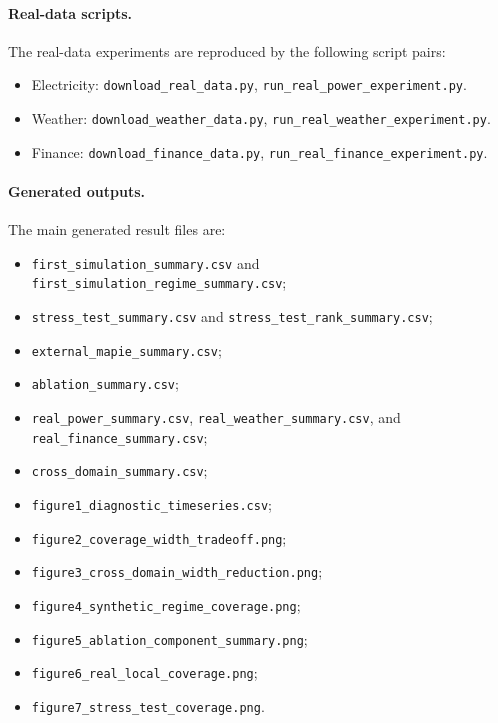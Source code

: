 \documentclass[11pt]{article}
\begin{document}
\paragraph{Real-data scripts.}
The real-data experiments are reproduced by the following script pairs:
\begin{itemize}
    \item Electricity: \texttt{download\_real\_data.py}, \texttt{run\_real\_power\_experiment.py}.
    \item Weather: \texttt{download\_weather\_data.py}, \texttt{run\_real\_weather\_experiment.py}.
    \item Finance: \texttt{download\_finance\_data.py}, \texttt{run\_real\_finance\_experiment.py}.
\end{itemize}

\paragraph{Generated outputs.}
The main generated result files are:
\begin{itemize}
    \item \texttt{first\_simulation\_summary.csv} and \texttt{first\_simulation\_regime\_summary.csv};
    \item \texttt{stress\_test\_summary.csv} and \texttt{stress\_test\_rank\_summary.csv};
    \item \texttt{external\_mapie\_summary.csv};
    \item \texttt{ablation\_summary.csv};
    \item \texttt{real\_power\_summary.csv}, \texttt{real\_weather\_summary.csv}, and \texttt{real\_finance\_summary.csv};
    \item \texttt{cross\_domain\_summary.csv};
    \item \texttt{figure1\_diagnostic\_timeseries.csv};
    \item \texttt{figure2\_coverage\_width\_tradeoff.png};
    \item \texttt{figure3\_cross\_domain\_width\_reduction.png};
    \item \texttt{figure4\_synthetic\_regime\_coverage.png};
    \item \texttt{figure5\_ablation\_component\_summary.png};
    \item \texttt{figure6\_real\_local\_coverage.png};
    \item \texttt{figure7\_stress\_test\_coverage.png}.
\end{itemize}
\end{document}
